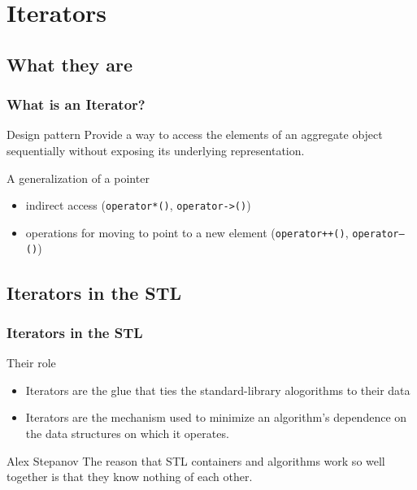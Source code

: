 \section{Iterators}
\subsection{What they are}
\begin{frame}
  \frametitle{What is an Iterator?}
  \begin{block}{Design pattern}
    Provide a way to access the elements of an aggregate object sequentially without exposing its underlying representation.
  \end{block}
  \vfill
  \begin{block}{A generalization of a pointer}
    \begin{itemize}
    \item indirect access (\texttt{operator*()}, \texttt{operator->()})
    \item operations for moving to point to a new element (\texttt{operator++()}, \texttt{operator--()}) 
    \end{itemize}
  \end{block}
\end{frame}

\subsection{Iterators in the STL}

\begin{frame}
  \frametitle{Iterators in the STL}
  \begin{block}{Their role}
    \begin{itemize}
    \item Iterators are the glue that ties the standard-library alogorithms to their data
    \item Iterators are the mechanism used to minimize an algorithm's dependence on the data structures on which it operates.
      \end{itemize}
  \end{block}
\vfill
  \begin{block}{Alex Stepanov}
    The reason that STL containers and algorithms work so well together is that they know nothing of each other.
    \end{block}
\end{frame}

